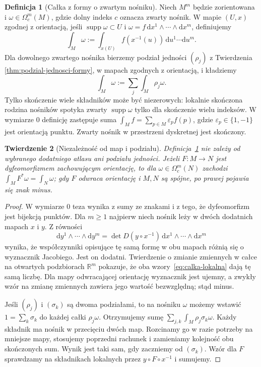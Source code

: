 \documentclass[11pt,a4paper,oneside]{report}
\newcommand{\R}{\mathbb{R}}
\newcommand{\supp}{\operatorname{supp}}
\newcommand{\dd}{\mathrm d}
\theoremstyle{plain}
\newtheorem{twierdzenie}{Twierdzenie}[section]
\theoremstyle{definition}
\newtheorem{definicja}[twierdzenie]{Definicja}
\theoremstyle{remark}
\begin{document}
\begin{definicja}[Całka z formy o zwartym nośniku]
\label{def:calka-z-formy}
Niech $M^m$ będzie zorientowana i
$\omega\in\Omega_c^m(M)$, gdzie dolny indeks $c$
oznacza zwarty nośnik. W mapie $(U,x)$ zgodnej z
orientacją, jeśli $\supp\omega\subset U$ i
$\omega=f\,\dd x^1\wedge\cdots\wedge\dd x^m$,
definiujemy
\begin{equation}\label{eq:calka-lokalna}
 \int_M\omega:=\int_{x(U)} f(x^{-1}(u))\,\dd u^1\cdots\dd u^m.
\end{equation}
Dla dowolnego zwartego nośnika bierzemy podział
jedności $(\rho_j)$ z Twierdzenia
\ref{thm:podzial-jednosci-formy}, w mapach zgodnych
z orientacją, i kładziemy
\begin{equation}\label{eq:calka-globalna}
 \int_M\omega:=\sum_j\int_M\rho_j\omega.
\end{equation}
Tylko skończenie wiele składników może być niezerowych:
lokalnie skończona rodzina nośników spotyka zwarty
$\supp\omega$ tylko dla skończenie wielu indeksów.
W wymiarze $0$ definicję zastępuje suma
$\int_M f=\sum_{p\in M}\varepsilon_p f(p)$,
gdzie $\varepsilon_p\in\{1,-1\}$ jest orientacją punktu.
Zwarty nośnik w przestrzeni dyskretnej jest skończony.
\end{definicja}

\begin{twierdzenie}[Niezależność od map i podziału]
\label{thm:calka-dobrze-okreslona}
Definicja~\ref{def:calka-z-formy} nie zależy od
wybranego dodatniego atlasu ani podziału jedności.
Jeżeli $F:M\to N$ jest dyfeomorfizmem zachowującym
orientację, to dla $\omega\in\Omega_c^m(N)$ zachodzi
$\int_M F^*\omega=\int_N\omega$; gdy $F$ odwraca
orientację i $M,N$ są spójne, po prawej pojawia się
znak minus.
\end{twierdzenie}
\begin{proof}
W wymiarze $0$ teza wynika z sumy ze znakami i z tego,
że dyfeomorfizm jest bijekcją punktów. Dla $m\geq1$
najpierw niech nośnik leży w dwóch dodatnich mapach
$x$ i $y$. Z równości
\[
 \dd y^1\wedge\cdots\wedge\dd y^m
 =\det D(y\circ x^{-1})\,
   \dd x^1\wedge\cdots\wedge\dd x^m
\]
wynika, że współczynniki opisujące tę samą formę
w obu mapach różnią się o wyznacznik Jacobiego.
Jest on dodatni. Twierdzenie o zmianie zmiennych
w całce na otwartych podzbiorach $\R^m$ pokazuje,
że oba wzory~\eqref{eq:calka-lokalna} dają tę samą
liczbę. Dla mapy odwracającej orientację wyznacznik
jest ujemny, a zwykły wzór na zmianę zmiennych
zawiera jego wartość bezwzględną; stąd minus.

Jeśli $(\rho_j)$ i $(\sigma_k)$ są dwoma podziałami,
to na nośniku $\omega$ możemy wstawić
$1=\sum_k\sigma_k$ do każdej całki $\rho_j\omega$.
Otrzymujemy sumę $\sum_{j,k}\int_M\rho_j\sigma_k\omega$.
Każdy składnik ma nośnik w przecięciu dwóch map.
Rozcinamy go w razie potrzeby na mniejsze mapy,
stosujemy poprzedni rachunek i zamieniamy kolejność
obu skończonych sum. Wynik jest taki sam, gdy
zaczniemy od $(\sigma_k)$. Wzór dla $F$ sprawdzamy
na składnikach lokalnych przez $y\circ F\circ x^{-1}$
i sumujemy.
\end{proof}
\end{document}
